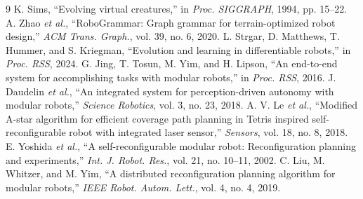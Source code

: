 \documentclass[conference]{IEEEtran}
\begin{document}
\begin{thebibliography}{9}
 K. Sims, ``Evolving virtual creatures,'' in \emph{Proc. SIGGRAPH}, 1994, pp. 15--22.
 A. Zhao \emph{et al.}, ``RoboGrammar: Graph grammar for terrain-optimized robot design,'' \emph{ACM Trans. Graph.}, vol. 39, no. 6, 2020.
 L. Strgar, D. Matthews, T. Hummer, and S. Kriegman, ``Evolution and learning in differentiable robots,'' in \emph{Proc. RSS}, 2024.
 G. Jing, T. Tosun, M. Yim, and H. Lipson, ``An end-to-end system for accomplishing tasks with modular robots,'' in \emph{Proc. RSS}, 2016.
 J. Daudelin \emph{et al.}, ``An integrated system for perception-driven autonomy with modular robots,'' \emph{Science Robotics}, vol. 3, no. 23, 2018.
 A. V. Le \emph{et al.}, ``Modified A-star algorithm for efficient coverage path planning in Tetris inspired self-reconfigurable robot with integrated laser sensor,'' \emph{Sensors}, vol. 18, no. 8, 2018.
 E. Yoshida \emph{et al.}, ``A self-reconfigurable modular robot: Reconfiguration planning and experiments,'' \emph{Int. J. Robot. Res.}, vol. 21, no. 10--11, 2002.
 C. Liu, M. Whitzer, and M. Yim, ``A distributed reconfiguration planning algorithm for modular robots,'' \emph{IEEE Robot. Autom. Lett.}, vol. 4, no. 4, 2019.
\end{thebibliography}
\end{document}
